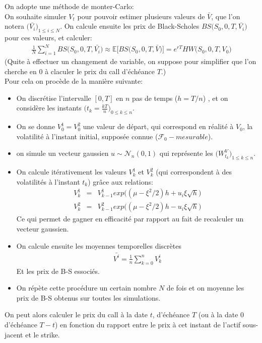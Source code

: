 \documentclass{report}
\begin{document}
On adopte une méthode de monter-Carlo:\\
On souhaite simuler $V_t$ pour pouvoir estimer plusieurs valeurs de $\bar{V}$, que l'on notera $\big(\bar{V_i}\big)_{1\leq i\leq N}$. On calcule ensuite les prix de Black-Scholes $BS\big(S_0, 0, T, \bar{V_i}\big)$ pour ces valeurs, et calculer:
\begin{eqnarray*}
\frac{1}{N}\sum\limits_{i=1}^N{BS\big(S_0, 0, T, \bar{V_i}\big)} \approx \mathbb{E}\Big[BS\big(S_0, 0, T, \bar{V}\big)\Big] = e^{rT}HW\big(S_0, 0, T, V_0\big)
\end{eqnarray*}
(Quite à effectuer un changement de variable, on suppose pour simplifier que l'on cherche en $0$ à claculer le prix du call d'échéance $T$.)\\
Pour cela on procède de la manière suivante:\\
\begin{itemize}
	\item On discrétise l'intervalle $[0, T]$ en $n$ pas de temps ($h = T/n$) , et on considère les instants $\big(t_k = \frac{kT}{n}\big)_{0\leq k\leq n}$.
	\item On se donne $V^1_0 = V^2_0$ une valeur de départ, qui correspond en réalité à $V_0$, la volatilité à l'instant initial, supposée connue ($\mathcal{F}_0-mesurable$).
	\item on simule un vecteur gaussien $u \sim \mathcal{N}_n(0, 1)$ qui représente les $\big(W^V_{t_k}\big)_{1\leq k\leq n}$.
	\item On calcule itérativement les valeurs $V^1_k$ et $V^2_k$ (qui correspondent à des volatilités à l'instant $t_k$) grâce aux relations:
	\begin{eqnarray*}
	V^1_k &=& V^1_{k-1}exp\Big((\mu-\xi^2/2)h + u_i\xi \sqrt{h}\Big)\\
	V^2_k &=& V^2_{k-1}exp\Big((\mu-\xi^2/2)h - u_i\xi \sqrt{h}\Big)
	\end{eqnarray*}
	Ce qui permet de gagner en efficacité par rapport au fait de recalculer un vecteur gaussien.
	\item On calcule ensuite les moyennes temporelles discrètes
	\begin{eqnarray*}
	\bar{V^i} = \frac{1}{n}\sum\limits_{k=0}^n{V^i_k}
	\end{eqnarray*}
	Et les prix de B-S essociés.
	\item On répète cette procédure un certain nombre $N$ de fois et on moyenne les prix de B-S obtenus sur toutes les simulations. 
\end{itemize}
On peut alors calculer le prix du call à la date $t$, d'échéance $T$ (ou à la date $0$ d'échéance $T-t$) en fonction du rapport entre le prix à cet instant de l'actif sous-jacent et le strike.
\end{document}
